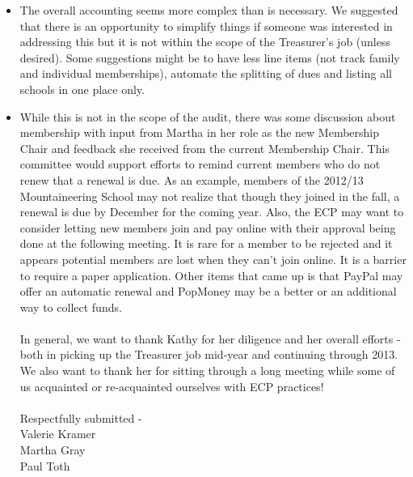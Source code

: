 \documentclass[10pt,a4paper]{article}
\newcommand\subsect[1]{%
  \subsection*{#1}%
  \addcontentsline{toc}{subsection}{#1}}
\newenvironment{Figure}
  {\par\medskip\noindent\minipage{\linewidth}}
  {\endminipage\par\medskip}
\begin{document}
\begin{multicols}{2}
\begin{itemize}
\item The overall accounting seems more complex than is necessary.   We suggested that there is an opportunity to simplify things if someone was interested in addressing this but it is not within the scope of the Treasurer's job (unless desired).  Some suggestions might be to have less line items (not track family and individual memberships), automate the splitting of dues and listing all schools in one place only.

\item While this is not in the scope of the audit, there was some discussion about membership with input from Martha in her role as the new Membership Chair and feedback she received from the current Membership Chair.  This committee would support efforts to remind current members who do not renew that a renewal is due. As an example, members of the 2012/13 Mountaineering School may not realize that though they joined in the fall, a renewal is due by December for the coming year.   Also, the ECP may want to consider letting new members join and pay online with their approval being done at the following meeting.  It is rare for a member to be rejected and it appears potential members are lost when they can't join online.  It is a barrier to require a paper application. Other items that came up is that PayPal may offer an automatic renewal and PopMoney may be a better or an additional way to collect funds.
\\
\\
In general, we want to thank Kathy for her diligence and her overall efforts - both in picking up the Treasurer job mid-year and continuing through 2013.  We also want to thank her for sitting through a long meeting while some of us acquainted or re-acquainted ourselves with ECP practices!
\\
\\
Respectfully submitted - \\
Valerie Kramer\\
Martha Gray\\
Paul Toth 
\end{itemize}


\end{multicols}
\clearpage
\pagebreak

%
%
%
\end{document}
